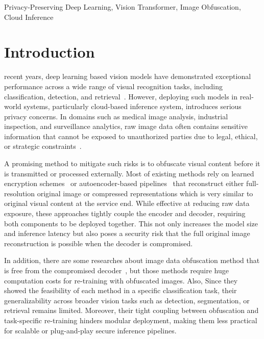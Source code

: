 \documentclass{ieeeaccess}
\newcommand{\rev}[1]{{\color{black}#1}}
\begin{document}
\begin{keywords}
\rev{Privacy-Preserving Deep Learning, Vision Transformer, Image Obfuscation, Cloud Inference}
\end{keywords}

\titlepgskip=-21pt

\maketitle

\section{Introduction} \label{sec:intro}

 recent years, deep learning based vision models have demonstrated exceptional performance across a wide range of visual recognition tasks, including classification, detection, and retrieval~\cite{VoulodimosDeep2018, CHAI2021100134, Alsajri_Hacimahmud_2023, TSIRTSAKIS2025298}. However, deploying such models in real-world systems, particularly cloud-based inference system, introduces serious privacy concerns. In domains such as medical image analysis, industrial inspection, and surveillance analytics, raw image data often contains sensitive information that cannot be exposed to unauthorized parties due to legal, ethical, or strategic constraints~\cite{Grünberg2017,info:doi/10.2196/22269, Padmapriya2024, 01630814-202314060-00005, app132312727}.

A promising method to mitigate such risks is to obfuscate visual content before it is transmitted or processed externally. Most of existing methods rely on learned encryption schemes~\cite{TANWAR2022103503,10.1145/3570165,Madani_2025} or autoencoder-based pipelines~\cite{s23010519,Zhou2024,SHIRI2024104583,10781629} that reconstruct either full-resolution original image or compressed representations which is very similar to original visual content at the service end. While effective at reducing raw data exposure, these approaches tightly couple the encoder and decoder, requiring both components to be deployed together. This not only increases the model size and inference latency but also poses a security risk that the full original image reconstruction is possible when the decoder is compromised.

In addition, there are some researches about image data obfuscation method that is free from the compromised decoder~\cite{9129656,10.1007/978-3-031-37586-6_18,s24103166}, but those methods require huge computation costs for re-training with obfuscated images. Also, Since they showed the feasibility of each method in a specific classification task, their generalizability across broader vision tasks such as detection, segmentation, or retrieval remains limited. Moreover, their tight coupling between obfuscation and task-specific re-training hinders modular deployment, making them less practical for scalable or plug-and-play secure inference pipelines.
\end{document}
